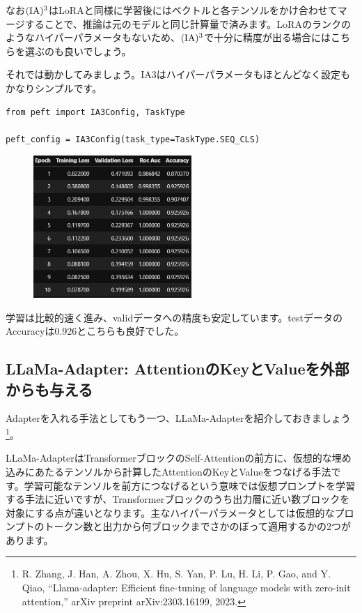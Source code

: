 \documentclass[a5paper,twoside,dvipdfmx]{jsarticle}
\begin{document}
なお$\rm{(IA)^3}$はLoRAと同様に学習後にはベクトルと各テンソルをかけ合わせてマージすることで、推論は元のモデルと同じ計算量で済みます。LoRAのランクのようなハイパーパラメータもないため、$\rm{(IA)^3}$で十分に精度が出る場合にはこちらを選ぶのも良いでしょう。

それでは動かしてみましょう。IA3はハイパーパラメータもほとんどなく設定もかなりシンプルです。

\begin{lstlisting}
from peft import IA3Config, TaskType
 
peft_config = IA3Config(task_type=TaskType.SEQ_CLS)
\end{lstlisting}


\newpage

\begin{figure}[h]
  \centering
  \includegraphics[width=60mm]{../C105Fig/gray/ia3_train.png}
 \end{figure} 

 
学習は比較的速く進み、validデータへの精度も安定しています。testデータのAccuracyは0.926とこちらも良好でした。


\subsection{LLaMa-Adapter: AttentionのKeyとValueを外部からも与える}

Adapterを入れる手法としてもう一つ、LLaMa-Adapterを紹介しておきましょう\footnote{R. Zhang, J. Han, A. Zhou, X. Hu, S. Yan, P. Lu, H. Li, P. Gao, and Y. Qiao, “Llama-adapter: Efficient fine-tuning of language models with zero-init attention,” arXiv preprint arXiv:2303.16199, 2023.}。

\newpage

LLaMa-AdapterはTransformerブロックのSelf-Attentionの前方に、仮想的な埋め込みにあたるテンソルから計算したAttentionのKeyとValueをつなげる手法です。学習可能なテンソルを前方につなげるという意味では仮想プロンプトを学習する手法に近いですが、Transformerブロックのうち出力層に近い数ブロックを対象にする点が違いとなります。主なハイパーパラメータとしては仮想的なプロンプトのトークン数と出力から何ブロックまでさかのぼって適用するかの2つがあります。
\end{document}
